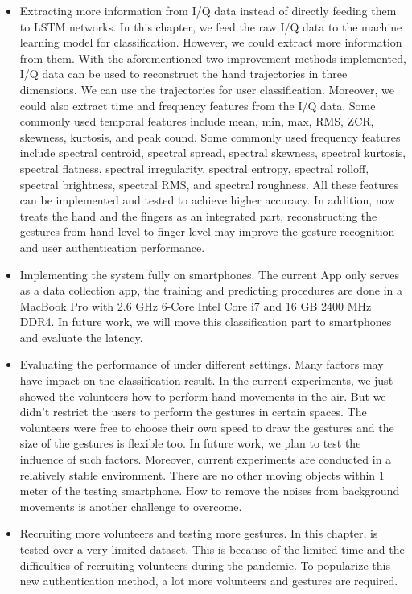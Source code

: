 \begin{itemize}
	\item Extracting more information from I/Q data instead of directly feeding them to LSTM networks. In this chapter, we feed the raw I/Q data to the machine learning model for classification. However, we could extract more information from them. With the aforementioned two improvement methods implemented, I/Q data can be used to reconstruct the hand trajectories in three dimensions. We can use the trajectories for user classification. Moreover, we could also extract time and frequency features from the I/Q data. Some commonly used temporal features include mean, min, max, RMS, ZCR, skewness, kurtosis, and peak cound. Some commonly used frequency features include spectral centroid, spectral spread,  spectral skewness,  spectral kurtosis,  spectral flatness, spectral irregularity, spectral entropy, spectral rolloff,	spectral brightness, 
	spectral RMS, and  spectral roughness. All these features can be implemented and tested to achieve higher accuracy. In addition, {\uu} now treats the hand and the fingers as an integrated part, reconstructing the gestures from hand level to finger level may improve the gesture recognition and user authentication performance.
	
	\item Implementing the system fully on smartphones. The current {\uu}App only serves as a data collection app, the training and predicting procedures are done in a MacBook Pro with 2.6 GHz 6-Core Intel Core i7 and 16 GB 2400 MHz DDR4. In future work, we will move this classification part to smartphones and evaluate the latency.
	
	
	\item Evaluating the performance of {\uu} under different settings. Many factors may have impact on the classification result. In the current experiments, we just showed the volunteers how to perform hand movements in the air. But we didn't restrict the users to perform the gestures in certain spaces. The volunteers were free to choose their own speed to draw the gestures and the size of the gestures is flexible too. In future work, we plan to test the influence of such factors. Moreover, current experiments are conducted in a relatively stable environment. There are no other moving objects within 1 meter of the testing smartphone. How to remove the noises from background movements is another challenge to overcome.
	
	
	\item Recruiting more volunteers and testing more gestures. In this chapter, {\uu} is tested over a very limited dataset. This is because of the limited time and the difficulties of recruiting volunteers during the pandemic. To popularize this new authentication method, a lot more volunteers and gestures are required. 
	
\end{itemize}


